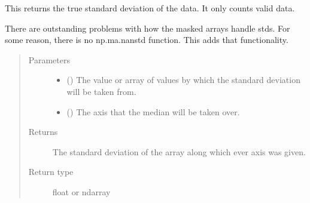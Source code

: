 \documentclass[letterpaper,10pt,english]{sphinxmanual}
\begin{document}
\begin{fulllineitems}
\label{\detokenize{python_docstrings/IfA_Smeargle.meta.mathematics:IfA_Smeargle.meta.mathematics.smeargle_std}}
This returns the true standard deviation of the data. It only counts
valid data.

There are outstanding problems with how the masked arrays handle stds.
For some reason, there is no np.ma.nanstd function. This adds that
functionality.
\begin{quote}\begin{description}
\item[{Parameters}] \leavevmode\begin{itemize}
\item {} 
 () \textendash{} The value or array of values by which the standard deviation will be
taken from.

\item {} 
 () \textendash{} The axis that the median will be taken over.

\end{itemize}

\item[{Returns}] \leavevmode
{} \textendash{} The standard deviation of the array along which ever axis was given.

\item[{Return type}] \leavevmode
float or ndarray

\end{description}\end{quote}

\end{fulllineitems}

\end{document}
